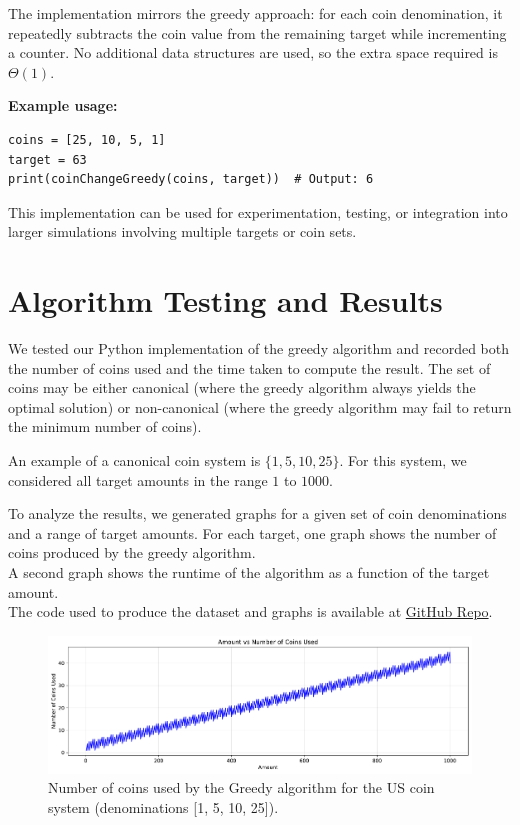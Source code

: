 \documentclass[12pt,a4paper]{report}
\begin{document}


The implementation mirrors the greedy approach: for each coin denomination, it repeatedly subtracts the coin value from the remaining target while incrementing a counter. 
No additional data structures are used, so the extra space required is \(\Theta(1)\). 

\textbf{Example usage:}
\begin{verbatim}
coins = [25, 10, 5, 1]
target = 63
print(coinChangeGreedy(coins, target))  # Output: 6
\end{verbatim}

This implementation can be used for experimentation, testing, or integration into larger simulations involving multiple targets or coin sets.

\section{Algorithm Testing and Results}
We tested our Python implementation of the greedy algorithm and recorded both 
the number of coins used and the time taken to compute the result. The set of 
coins may be either canonical (where the greedy algorithm always yields the 
optimal solution) or non-canonical (where the greedy algorithm may fail to 
return the minimum number of coins).

An example of a canonical coin system is 
\(\{1, 5, 10, 25\}\). For this system, we considered all target amounts in the 
range \(1\) to \(1000\).

To analyze the results, we generated graphs for a given set of coin denominations and a range of target amounts. 
For each target, one graph shows the number of coins produced by the greedy algorithm.\\
A second graph shows the runtime of the algorithm as a function of the target amount.\\
The code used to produce the dataset and graphs is available at \href{https://github.com/ItzKanashii/Coin-Change/tree/main/projectFile}{GitHub Repo}. 

\begin{figure}[H]
  \centering
  \includegraphics[width=\textwidth]{graphs/greedy_coins_standard_plot.pdf}
  \caption{Number of coins used by the Greedy algorithm for the US coin system (denominations [1, 5, 10, 25]).}
  \label{fig:greedy_coins_standard_plot}
\end{figure}
\end{document}
